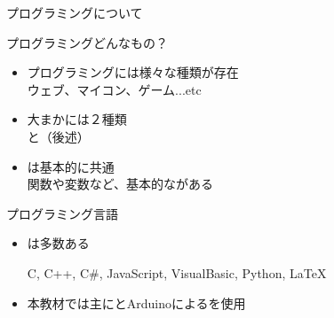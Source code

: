 \documentclass[dvipdfmx]{beamer}
\begin{document}
  \begin{frame}{プログラミングについて}
    \begin{large}プログラミングどんなもの？\end{large}
    \begin{itemize}
      \setlength{\itemsep}{3mm}
      \item プログラミングには様々な種類が存在\\ウェブ、マイコン、ゲーム...etc
      \item 大まかには２種類\\と（後述）
      \item {}は基本的に共通\\関数や変数など、基本的ながある
    \end{itemize}
    \vfill
    \begin{large}プログラミング言語\end{large}
    \begin{itemize}
      \setlength{\itemsep}{3mm}
      \item {}は多数ある\par C, C++, C\#, JavaScript, VisualBasic, Python, \LaTeX
      \item 本教材では主にとArduinoによるを使用
    \end{itemize}
  \end{frame}
\end{document}
